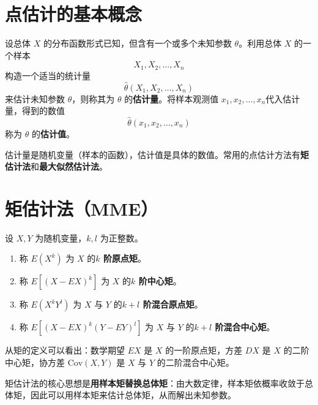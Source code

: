 \documentclass[lang=cn,11pt]{elegantbook}
\begin{document}
\section{点估计的基本概念}

\begin{definition}[点估计] \label{def:point-est}
设总体 \(X\) 的分布函数形式已知，但含有一个或多个未知参数 \(\theta\)。利用总体 \(X\) 的一个样本 \[X_1, X_2, \dots, X_n\]
构造一个适当的统计量 \[\hat{\theta}(X_1, X_2, \dots, X_n)\] 
来估计未知参数 \(\theta\)，则称其为 \(\theta\) 的\textbf{估计量}。将样本观测值 \(x_1, x_2, \dots, x_n\)代入估计量，得到的数值 \[\hat{\theta}(x_1, x_2, \dots, x_n)\] 称为 \(\theta\) 的\textbf{估计值}。
\end{definition}

\begin{note}
估计量是随机变量（样本的函数），估计值是具体的数值。常用的点估计方法有\textbf{矩估计法}和\textbf{最大似然估计法}。
\end{note}

\section{矩估计法（MME）} \label{subsec:mme}

\begin{definition}[矩] \label{def:moments}
设 \(X, Y\) 为随机变量，\(k, l\) 为正整数。
\begin{enumerate}
    \item 称 \(E(X^k)\) 为 \(X\) 的\textbf{\(k\) 阶原点矩}。
    \item 称 \(E[(X - EX)^k]\) 为 \(X\) 的\textbf{\(k\) 阶中心矩}。
    \item 称 \(E(X^k Y^l)\) 为 \(X\) 与 \(Y\) 的\textbf{\(k+l\) 阶混合原点矩}。
    \item 称 \(E[(X - EX)^k (Y - EY)^l]\) 为 \(X\) 与 \(Y\) 的\textbf{\(k+l\) 阶混合中心矩}。
\end{enumerate}
\end{definition}

\begin{note}
从矩的定义可以看出：数学期望 \(EX\) 是 \(X\) 的一阶原点矩，方差 \(DX\) 是 \(X\) 的二阶中心矩，协方差 \(\mathrm{Cov}(X,Y)\) 是 \(X\) 与 \(Y\) 的二阶混合中心矩。
\end{note}

矩估计法的核心思想是\textbf{用样本矩替换总体矩}：由大数定律，样本矩依概率收敛于总体矩，因此可以用样本矩来估计总体矩，从而解出未知参数。
\end{document}

